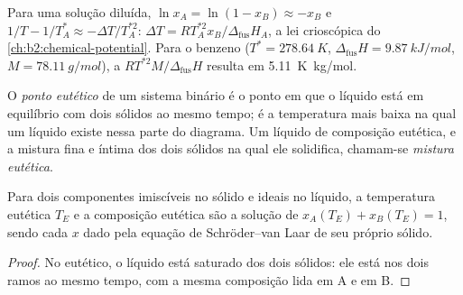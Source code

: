 Para uma solução diluída, $\ln x_A = \ln(1 - x_B) \approx -x_B$ e $1/T -
1/T_A^* \approx -\Delta T/T_A^{*2}$: $\Delta T = RT_A^{*2}x_B/\Delta_{\text{fus}}H_A$,
a lei crioscópica do \cref{ch:b2:chemical-potential}. Para o benzeno ($T^* =
\qty{278.64}{K}$, $\Delta_{\text{fus}}H = \qty{9.87}{kJ/mol}$, $M =
\qty{78.11}{g/mol}$), a  $RT^{*2}M/\Delta_{\text{fus}}H$
resulta em \qty{5.11}{K.kg/mol}.

\begin{definition}[Eutético]\label{def:b2:solid-liquid-diagrams:eutectic}
O \emph{ponto eutético} de um sistema binário é o
ponto em que o líquido está em equilíbrio com dois sólidos ao mesmo tempo; é
a temperatura mais baixa na qual um líquido existe nessa parte do diagrama.
Um líquido de composição eutética, e a mistura fina e íntima dos dois
sólidos na qual ele solidifica, chamam-se \emph{mistura
eutética}.
\end{definition}

\begin{corollary}\label{cor:b2:solid-liquid-diagrams:eutectic}
Para dois componentes imiscíveis no sólido e ideais no líquido, a
temperatura eutética $T_E$ e a composição eutética são a solução de
$x_A(T_E) + x_B(T_E) = 1$, sendo cada $x$ dado pela equação de
Schröder--van Laar de seu próprio sólido.
\end{corollary}

\begin{proof}
No eutético, o líquido está saturado dos dois sólidos: ele está nos dois
ramos ao mesmo tempo, com a mesma composição lida em A e em B.
\end{proof}

